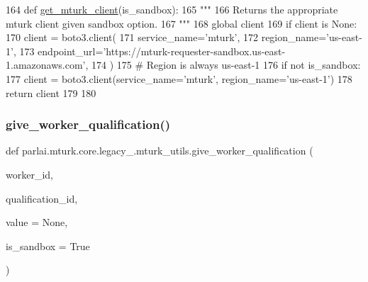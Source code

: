 \begin{DoxyCode}
164 \textcolor{keyword}{def }\hyperlink{namespaceparlai_1_1mturk_1_1core_1_1mturk__utils_a577e2527c04682284394b0951a090695}{get\_mturk\_client}(is\_sandbox):
165     \textcolor{stringliteral}{"""}
166 \textcolor{stringliteral}{    Returns the appropriate mturk client given sandbox option.}
167 \textcolor{stringliteral}{    """}
168     \textcolor{keyword}{global} client
169     \textcolor{keywordflow}{if} client \textcolor{keywordflow}{is} \textcolor{keywordtype}{None}:
170         client = boto3.client(
171             service\_name=\textcolor{stringliteral}{'mturk'},
172             region\_name=\textcolor{stringliteral}{'us-east-1'},
173             endpoint\_url=\textcolor{stringliteral}{'https://mturk-requester-sandbox.us-east-1.amazonaws.com'},
174         )
175         \textcolor{comment}{# Region is always us-east-1}
176         \textcolor{keywordflow}{if} \textcolor{keywordflow}{not} is\_sandbox:
177             client = boto3.client(service\_name=\textcolor{stringliteral}{'mturk'}, region\_name=\textcolor{stringliteral}{'us-east-1'})
178     \textcolor{keywordflow}{return} client
179 
180 
\end{DoxyCode}
\mbox{\label{namespaceparlai_1_1mturk_1_1core_1_1legacy__2018_1_1mturk__utils_aaaf07be966ed2720b918f8dd2775e18a}} 
\subsubsection{\texorpdfstring{give\+\_\+worker\+\_\+qualification()}{give\_worker\_qualification()}}
{\footnotesize\ttfamily def parlai.\+mturk.\+core.\+legacy\+\_.\+mturk\+\_\+utils.\+give\+\_\+worker\+\_\+qualification (\begin{DoxyParamCaption}\item[{}]{worker\+\_\+id,  }\item[{}]{qualification\+\_\+id,  }\item[{}]{value = {\ttfamily None},  }\item[{}]{is\+\_\+sandbox = {\ttfamily True} }\end{DoxyParamCaption})}

